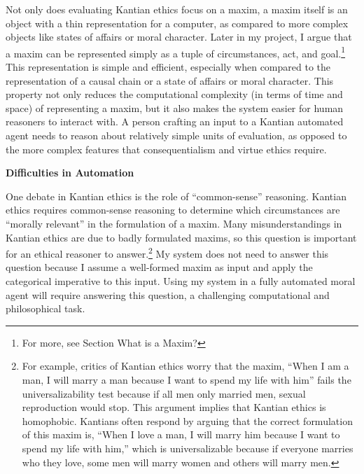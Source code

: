 \begin{isabellebody}
\begin{isamarkuptext}
Not only does evaluating Kantian ethics focus on a maxim, a maxim itself is an object
with a thin representation for a computer, as compared to more complex objects like states of 
affairs or moral character. Later in my project, I argue that a maxim can be represented simply as 
a tuple of circumstances, act, and goal.\footnote{For more, see Section What is a Maxim?} This representation
is simple and efficient, especially when compared to the representation of a causal chain or a state of 
affairs or moral character. This property not only reduces the computational complexity
(in terms of time and space) of representing a maxim, but it also makes the system easier for human reasoners
to interact with. A person crafting an input to a Kantian automated agent needs to reason about relatively
simple units of evaluation, as opposed to the more complex features that consequentialism and virtue
ethics require.%
\end{isamarkuptext}\isamarkuptrue%
%
\begin{isamarkuptext}%
\noindent \textbf{Difficulties in Automation}%
\end{isamarkuptext}\isamarkuptrue%
%
\begin{isamarkuptext}%
One debate in Kantian 
ethics is the role of ``common-sense'' reasoning. Kantian ethics requires common-sense reasoning to 
determine which circumstances are ``morally relevant'' in the formulation of a maxim. Many misunderstandings
in Kantian ethics are due to badly formulated maxims, so this question is important for an ethical 
reasoner to answer.\footnote{For example, critics of Kantian ethics worry that the maxim, ``When I am a
man, I will marry a man because I want to spend my life with him'' fails the universalizability
test because if all men only married men, sexual reproduction would stop. This argument implies 
that Kantian ethics is homophobic. Kantians often respond by arguing that the correct formulation of 
this maxim is, ``When I love a man, I will marry him because I want to spend my life with him,'' which
is universalizable because if everyone marries who they love, some men will marry women and others will
marry men.} My system does not need to answer this question because I assume a well-formed
maxim as input and apply the categorical imperative to this input. Using my system in a fully automated
moral agent will require answering this question, a challenging computational and philosophical task. 


\end{isamarkuptext}
\end{isabellebody}
